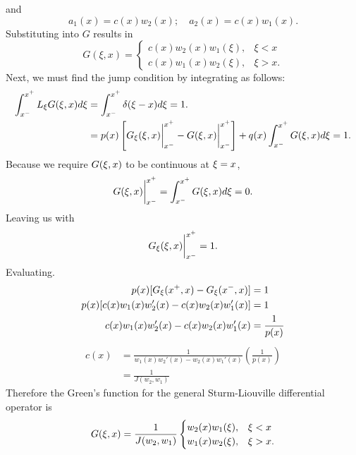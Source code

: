     and
    \begin{equation*}
        a_1(x)=c(x)w_2(x); \quad a_2(x)=c(x)w_1(x).
    \end{equation*}
    Substituting into \(G\) results in
    \begin{equation*}
        G(\xi,x)=\begin{cases}
            c(x)w_2(x)w_1(\xi), &\xi < x\\
            c(x)w_1(x)w_2(\xi), &\xi > x.
        \end{cases}
    \end{equation*}
    Next, we must find the jump condition by integrating as follows:
    \begin{equation*}
        \begin{split}
            \int_{x^-}^{x^+} L_\xi G(\xi,x) d\xi &= \int_{x^-}^{x^+} \delta(\xi-x)d\xi = 1.\\
            &=p(x)\left[G_\xi(\xi,x)\biggr\rvert_{x^-}^{x^+}-G(\xi,x)\biggr\rvert_{x^-}^{x^+}\right]+q(x)\int_{x^-}^{x^+}G(\xi,x)d\xi=1.
        \end{split}
    \end{equation*}
    Because we require \(G(\xi,x)\) to be continuous at \(\xi=x\), 
    \begin{equation*}
        G(\xi,x)\biggr\rvert_{x^-}^{x^+} = \int_{x^-}^{x^+}G(\xi,x)d\xi = 0.
    \end{equation*}
    Leaving us with
    \begin{equation*}
        G_\xi(\xi,x)\biggr\rvert_{x^-}^{x^+} = 1.
    \end{equation*}
    Evaluating.
    \begin{equation*}
        \begin{split}
            p(x)[G_\xi(x^+,x) - G_\xi(x^-,x)] &= 1\\
            p(x)[c(x)w_1(x)w_2'(x) - c(x)w_2(x)w_1'(x)] &=1\\
            c(x)w_1(x)w_2'(x) - c(x)w_2(x)w_1'(x) &=\frac{1}{p(x)}\\
        \end{split}
    \end{equation*}
    \begin{equation*}
        \begin{split}
            c(x) &= \frac{1}{w_1(x)w_2'(x) - w_2(x)w_1'(x)}\left(\frac{1}{p(x)} \right)\\
            &= \frac{1}{J(w_2,w_1)}
        \end{split}
    \end{equation*}
    Therefore the Green's function for the general Sturm-Liouville differential operator is 
    \begin{equation*}
        G(\xi,x) = \frac{1}{J(w_2,w_1)} \begin{cases}
            w_2(x)w_1(\xi), &\xi < x\\
            w_1(x)w_2(\xi), &\xi > x.
        \end{cases}
    \end{equation*}
